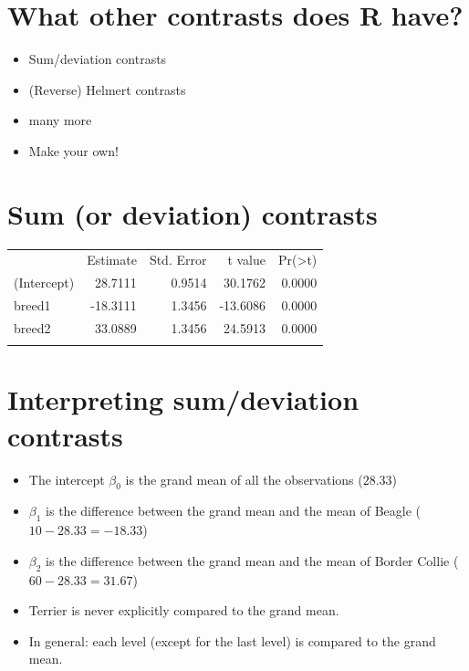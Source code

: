 \documentclass[]{article}
\newenvironment{Shaded}{}{}
\newcommand{\KeywordTok}[1]{\textcolor[rgb]{0.00,0.44,0.13}{\textbf{{#1}}}}
\newcommand{\DataTypeTok}[1]{\textcolor[rgb]{0.56,0.13,0.00}{{#1}}}
\newcommand{\StringTok}[1]{\textcolor[rgb]{0.25,0.44,0.63}{{#1}}}
\newcommand{\NormalTok}[1]{{#1}}
\begin{document}
\section{What other contrasts does R
have?}\label{what-other-contrasts-does-r-have}

\begin{itemize}
\itemsep1pt\parskip0pt
\item
  Sum/deviation contrasts
\item
  (Reverse) Helmert contrasts
\item
  many more
\item
  Make your own!
\end{itemize}

\section{Sum (or deviation) contrasts}\label{sum-or-deviation-contrasts}

\begin{Shaded}
\end{Shaded}

\begin{longtable}[c]{@{}lrrrr@{}}
\toprule\addlinespace
& Estimate & Std. Error & t value &
Pr(\textgreater{}\textbar{}t\textbar{})
\\\addlinespace
\midrule\endhead
(Intercept) & 28.7111 & 0.9514 & 30.1762 & 0.0000
\\\addlinespace
breed1 & -18.3111 & 1.3456 & -13.6086 & 0.0000
\\\addlinespace
breed2 & 33.0889 & 1.3456 & 24.5913 & 0.0000
\\\addlinespace
\bottomrule
\end{longtable}

\section{Interpreting sum/deviation
contrasts}\label{interpreting-sumdeviation-contrasts}

\begin{itemize}
\itemsep1pt\parskip0pt
\item
  The intercept $\beta_0$ is the grand mean of all the observations
  ($28.33$)
\item
  $\beta_1$ is the difference between the grand mean and the mean of
  Beagle ($10 - 28.33 = -18.33$)
\item
  $\beta_2$ is the difference between the grand mean and the mean of
  Border Collie ($60 - 28.33 = 31.67$)
\item
  Terrier is never explicitly compared to the grand mean.
\item
  In general: each level (except for the last level) is compared to the
  grand mean.
\end{itemize}
\end{document}
